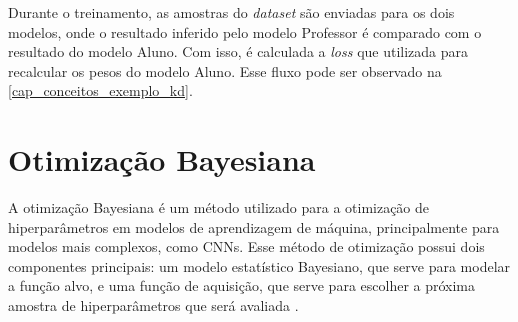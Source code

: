 Durante o treinamento, as amostras do \textit{dataset} são enviadas para os dois modelos, onde o resultado inferido pelo
modelo Professor é comparado com o resultado do modelo Aluno.
Com isso, é calculada a \textit{loss} que utilizada para recalcular os pesos do modelo Aluno.
Esse fluxo pode ser observado na \autoref{cap_conceitos_exemplo_kd}.


%


\section{Otimização Bayesiana}\label{cap_conceitos_bayesiana}
A otimização Bayesiana é um método utilizado para a otimização de hiperparâmetros em modelos de aprendizagem de
máquina, principalmente para modelos mais complexos, como CNNs.
Esse método de otimização possui dois componentes principais: um modelo estatístico Bayesiano, que serve para modelar a
função alvo, e uma função de aquisição, que serve para escolher a próxima amostra de hiperparâmetros que será avaliada
\cite{frazier2018tutorial}.


